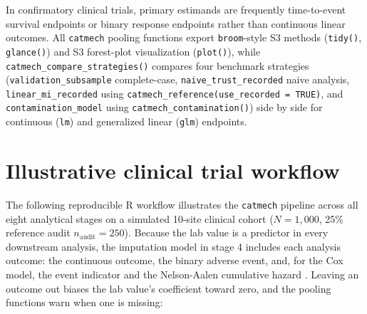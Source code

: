 \documentclass[
]{article}
\begin{document}
In confirmatory clinical trials, primary estimands are frequently
time-to-event survival endpoints or binary response endpoints rather
than continuous linear outcomes. All \texttt{catmech} pooling functions
export \texttt{broom}-style S3 methods (\texttt{tidy()},
\texttt{glance()}) and S3 forest-plot visualization (\texttt{plot()}),
while \texttt{catmech\_compare\_strategies()} compares four benchmark
strategies (\texttt{validation\_subsample} complete-case,
\texttt{naive\_trust\_recorded} naive analysis,
\texttt{linear\_mi\_recorded} using
\texttt{catmech\_reference(use\_recorded\ =\ TRUE)}, and
\texttt{contamination\_model} using \texttt{catmech\_contamination()})
side by side for continuous (\texttt{lm}) and generalized linear
(\texttt{glm}) endpoints.

\section{Illustrative clinical trial
workflow}\label{illustrative-clinical-trial-workflow}

The following reproducible R workflow illustrates the \texttt{catmech}
pipeline across all eight analytical stages on a simulated 10-site
clinical cohort (\(N = 1,000\), 25\% reference audit
\(n_{\text{audit}} = 250\)). Because the lab value is a predictor in
every downstream analysis, the imputation model in stage 4 includes each
analysis outcome: the continuous outcome, the binary adverse event, and,
for the Cox model, the event indicator and the Nelson-Aalen cumulative
hazard \citep{white2009imputing}. Leaving an outcome out biases the lab
value's coefficient toward zero, and the pooling functions warn when one
is missing:
\end{document}
